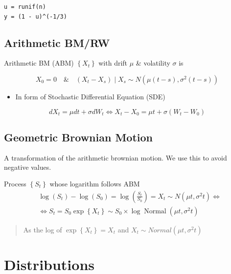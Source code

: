 \documentclass[
  oneside]{book}
\providecommand{\tightlist}{%
  \setlength{\itemsep}{0pt}\setlength{\parskip}{0pt}}
\begin{document}
\begin{verbatim}
u = runif(n)
y = (1 - u)^(-1/3)
\end{verbatim}

\hypertarget{arithmetic-bmrw}{%
\subsection{Arithmetic BM/RW}\label{arithmetic-bmrw}}

Arithmetic BM (ABM) \(\left\{X_t\right\}\) with drift \(\mu\) \& volatility \(\sigma\) is

\[
X_0=0 \quad \& \quad \left(X_t-X_s\right) \mid X_s \sim N\left(\mu(t-s), \sigma^2(t-s)\right)
\]

\begin{itemize}
\tightlist
\item
  In form of Stochastic Differential Equation (SDE)
\end{itemize}

\[
d X_t=\mu d t+\sigma d W_t \Leftrightarrow X_t-X_0=\mu t+\sigma\left(W_t-W_0\right)
\]

\hypertarget{geometric-brownian-motion-1}{%
\subsection{Geometric Brownian Motion}\label{geometric-brownian-motion-1}}

A transformation of the arithmetic brownian motion. We use this to avoid negative values.

Process \(\left\{S_t\right\}\) whose logarithm follows ABM
\[
\begin{aligned}
& \log \left(S_t\right)-\log \left(S_0\right)=\log \left(\frac{S_t}{S_0}\right)=X_t \sim N\left(\mu t, \sigma^2 t\right) \Leftrightarrow \\
& \Leftrightarrow S_t=S_0 \exp \left\{X_t\right\} \sim S_0 \times \log \operatorname{Normal}\left(\mu t, \sigma^2 t\right)
\end{aligned}
\]

\begin{quote}
As the log of \(\exp \left\{ X_{t} \right\} = X_{t}\) and \(X_{t} \sim Normal(\mu t, \sigma^{2}t)\)
\end{quote}

\hypertarget{distributions}{%
\section{Distributions}\label{distributions}}
\end{document}
